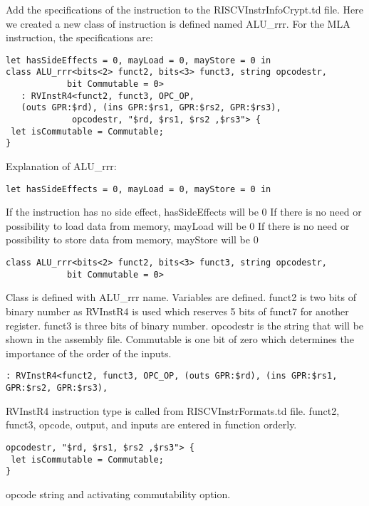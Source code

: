 Add the specifications of the instruction to the RISCVInstrInfoCrypt.td file. Here we created a new class of instruction is defined named ALU\_rrr. For the MLA instruction, the specifications are:

\begin{lstlisting}[caption= ALU\_rrr,label={lst:ALU_rrr}]
let hasSideEffects = 0, mayLoad = 0, mayStore = 0 in
class ALU_rrr<bits<2> funct2, bits<3> funct3, string opcodestr,
            bit Commutable = 0>
   : RVInstR4<funct2, funct3, OPC_OP, 
   (outs GPR:$rd), (ins GPR:$rs1, GPR:$rs2, GPR:$rs3),
             opcodestr, "$rd, $rs1, $rs2 ,$rs3"> {
 let isCommutable = Commutable;
}
\end{lstlisting}
Explanation of ALU\_rrr:
\begin{lstlisting}
let hasSideEffects = 0, mayLoad = 0, mayStore = 0 in
\end{lstlisting}

If the instruction has no side effect, hasSideEffects will be 0
If there is no need or possibility to load data from memory, mayLoad will be 0
If there is no need or possibility to store data from memory, mayStore will be 0


\begin{lstlisting}
class ALU_rrr<bits<2> funct2, bits<3> funct3, string opcodestr,
            bit Commutable = 0>
\end{lstlisting}

Class is defined with ALU\_rrr name. Variables are defined. funct2 is two bits of binary number as RVInstR4 is used which reserves 5 bits of funct7 for another register. funct3 is three bits of binary number. opcodestr is the string that will be shown in the assembly file. Commutable is one bit of zero which determines the importance of the order of the inputs.


\begin{lstlisting}
: RVInstR4<funct2, funct3, OPC_OP, (outs GPR:$rd), (ins GPR:$rs1, GPR:$rs2, GPR:$rs3),
\end{lstlisting}

RVInstR4 instruction type is called from RISCVInstrFormats.td file. funct2, funct3, opcode, output, and inputs are entered in function orderly.

\begin{lstlisting}
opcodestr, "$rd, $rs1, $rs2 ,$rs3"> {
 let isCommutable = Commutable;
}
\end{lstlisting}

opcode string and activating commutability option.

